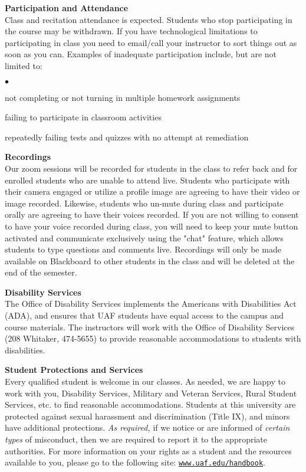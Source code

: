 \documentclass[12pt]{article}
\renewcommand{\emph}[1]{\textsf{\textbf{#1}}}
\newcommand{\localhead}[1]{\par\smallskip\textbf{#1}\nobreak\\}%
\def\subheading#1{\localhead{\emph{#1}}}
\newenvironment{clist}%
{\bgroup\parskip 0pt\begin{list}{$\bullet$}{\partopsep 4pt\topsep 0pt\itemsep -2pt}}%
{\end{list}\egroup}%
\begin{document}
\subheading{Participation and Attendance}
Class and recitation attendance is expected. Students who stop participating in the course may be withdrawn. If you have technological limitations to participating in class you need to email/call your instructor to sort things out as soon as you can. Examples of inadequate participation include,
but are not limited to:
\begin{clist}
\item not completing or not turning in multiple homework assignments
\item failing to participate in classroom activities
\item repeatedly failing tests and quizzes with no attempt at remediation
\end{clist}

\subheading{Recordings}
Our zoom sessions will be  recorded for students in the class to refer back and for enrolled students who are unable to attend live. Students who participate with their camera engaged or utilize a profile image are agreeing to have their video or image recorded.  Likewise, students who un-mute during class and participate orally are agreeing to have their voices recorded.  If you are not willing to consent to have your voice recorded during class, you will need to keep your mute button activated and communicate exclusively using the "chat" feature, which allows students to type questions and comments live. Recordings will only be made available on Blackboard to other students in the class and will be deleted at the end of the semester.


\subheading{Disability Services}
The Office of Disability Services implements the
Americans with Disabilities Act (ADA), and ensures that UAF students
have equal access to the campus and course materials. The instructors will work with
the Office of Disability Services (208 Whitaker, 474-5655) to provide
reasonable accommodations to students with disabilities.

\subheading{Student Protections and Services}
Every qualified student is welcome in our classes.  As needed, we are happy to work with you, Disability Services, Military and Veteran Services, Rural Student Services, etc. to find reasonable accommodations. Students at this university are protected against sexual harassment and discrimination (Title IX), and minors have additional protections. \textit{As required,} if we notice or are informed of \textit{certain types} of misconduct, then we are required to report it to the appropriate authorities.  For more information on your rights as a student and the resources available to you, please go to the following site: \href{https://www.uaf.edu/handbook/}{\texttt{www.uaf.edu/handbook}}.
\end{document}
